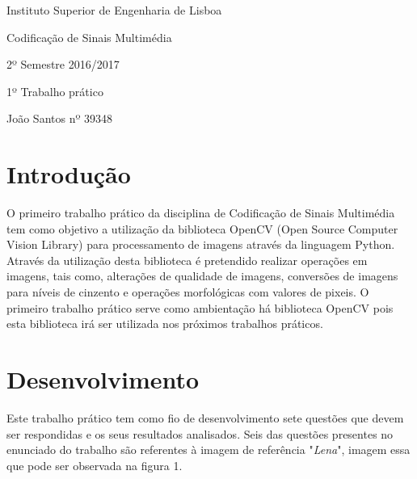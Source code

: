 \documentclass[12pt,a4paper]{article}
\begin{document}
\begin{titlepage}
\centering
{\LARGE Instituto Superior de Engenharia de Lisboa \par}
\vspace{1cm}
{\Large Codificação de Sinais Multimédia\par}
{\Large 2º Semestre 2016/2017\par}
\vspace{1.5cm}
{\huge 1º Trabalho prático\par}
\vspace{2cm}
{\Large João Santos nº 39348\par}
\end{titlepage}

\tableofcontents
\listoffigures

\clearpage

\section{Introdução}
O primeiro trabalho prático da disciplina de Codificação de Sinais Multimédia tem como objetivo a utilização da biblioteca OpenCV (Open Source Computer Vision Library) para processamento de imagens através da linguagem Python. Através da utilização desta biblioteca é pretendido realizar operações em imagens, tais como, alterações de qualidade de imagens, conversões de imagens para níveis de cinzento e operações morfológicas com valores de pixeis. O primeiro trabalho prático serve como ambientação há biblioteca OpenCV pois esta biblioteca irá ser utilizada nos próximos trabalhos práticos.

\clearpage

\section{Desenvolvimento}
Este trabalho prático tem como fio de desenvolvimento sete questões que devem ser respondidas e os seus resultados analisados. Seis das questões presentes no enunciado do trabalho são referentes à imagem de referência "\textit{Lena}", imagem essa que pode ser observada na figura 1.
\end{document}
